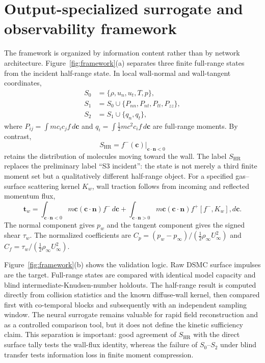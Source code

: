 \documentclass[aip,pof,preprint,floatfix,amsmath,amssymb]{revtex4-2}
\begin{document}
\section{Output-specialized surrogate and observability framework}
The framework is organized by information content rather than by network architecture. Figure~\ref{fig:framework}(a) separates three finite full-range states from the incident half-range state. In local wall-normal and wall-tangent coordinates,
\begin{align}
S_0 &= \{\rho,u_n,u_t,T,p\},\\
S_1 &= S_0\cup\{P_{nn},P_{nt},P_{tt},P_{zz}\},\\
S_2 &= S_1\cup\{q_n,q_t\},
\end{align}
where $P_{ij}=\int m c_i c_j f\,d\bm{c}$ and $q_i=\int \tfrac12m c^2c_i f\,d\bm{c}$ are full-range moments. By contrast,
\begin{equation}
S_{\mathrm{HR}}=f^{-}(\bm{c})\big|_{\bm{c}\cdot\bm{n}<0}
\end{equation}
retains the distribution of molecules moving toward the wall. The label $S_{\mathrm{HR}}$ replaces the preliminary label ``S3 incident'': the state is not merely a third finite moment set but a qualitatively different half-range object. For a specified gas--surface scattering kernel $K_w$, wall traction follows from incoming and reflected momentum flux,
\begin{equation}
\bm{t}_w=\int_{\bm{c}\cdot\bm{n}<0}m\bm{c}(\bm{c}\cdot\bm{n})f^{-}\,d\bm{c}
 +\int_{\bm{c}\cdot\bm{n}>0}m\bm{c}(\bm{c}\cdot\bm{n})f^{+}[f^{-},K_w],d\bm{c}.
\label{eq:walltraction}
\end{equation}
The normal component gives $p_w$ and the tangent component gives the signed shear $\tau_w$. The normalized coefficients are $C_p=(p_w-p_\infty)/(\tfrac12\rho_\infty U_\infty^2)$ and $C_f=\tau_w/(\tfrac12\rho_\infty U_\infty^2)$.

Figure~\ref{fig:framework}(b) shows the validation logic. Raw DSMC surface impulses are the target. Full-range states are compared with identical model capacity and blind intermediate-Knudsen-number holdouts. The half-range result is computed directly from collision statistics and the known diffuse-wall kernel, then compared first with co-temporal blocks and subsequently with an independent sampling window. The neural surrogate remains valuable for rapid field reconstruction and as a controlled comparison tool, but it does not define the kinetic sufficiency claim. This separation is important: good agreement of $S_{\mathrm{HR}}$ with the direct surface tally tests the wall-flux identity, whereas the failure of $S_0$--$S_2$ under blind transfer tests information loss in finite moment compression.
\end{document}
